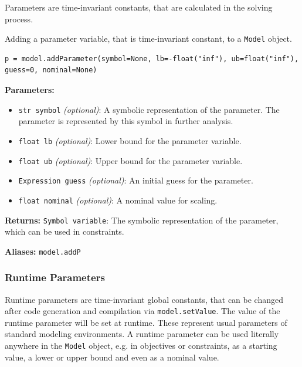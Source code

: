 \documentclass[12pt]{article}
\begin{document}
Parameters are time-invariant constants, that are calculated in the
solving process.

\begin{mdframed}[backgroundcolor=gray!10, roundcorner=10pt,
		linewidth=1pt]

	Adding a parameter variable, that is time-invariant constant,
	to a \texttt{Model} object.

	\begin{lstlisting}
p = model.addParameter(symbol=None, lb=-float("inf"), ub=float("inf"), guess=0, nominal=None)
		\end{lstlisting}
	\label{addParameter}
	\textbf{Parameters:}
	\begin{itemize}
		\item \texttt{str symbol} \emph{(optional)}: A symbolic
		      representation of the parameter. The parameter is
		      represented by this
		      symbol in further analysis.
		\item \texttt{float lb} \emph{(optional)}: Lower bound
		      for the parameter variable.
		\item \texttt{float ub} \emph{(optional)}: Upper bound
		      for the parameter variable.
		\item \texttt{Expression guess} \emph{(optional)}: An
		      initial guess for the parameter.
		\item \texttt{float nominal} \emph{(optional)}: A
		      nominal value for scaling.
	\end{itemize}

	\textbf{Returns:}
	\texttt{Symbol variable}: The symbolic representation of the
	parameter, which can be used in constraints.

	\textbf{Aliases:} \texttt{model.addP}
\end{mdframed}

\subsubsection{Runtime Parameters}
\label{c:runtimeParameters}
Runtime parameters are time-invariant global constants, that can be
changed after code generation and compilation via \texttt{model.setValue}. The
value of the
runtime parameter will be set at runtime. These represent usual
parameters of standard modeling environments. A runtime parameter can be used
literally anywhere in the \texttt{Model} object, e.g. in objectives or
constraints, as a starting value, a lower or upper bound and even as a nominal
value.
\end{document}
